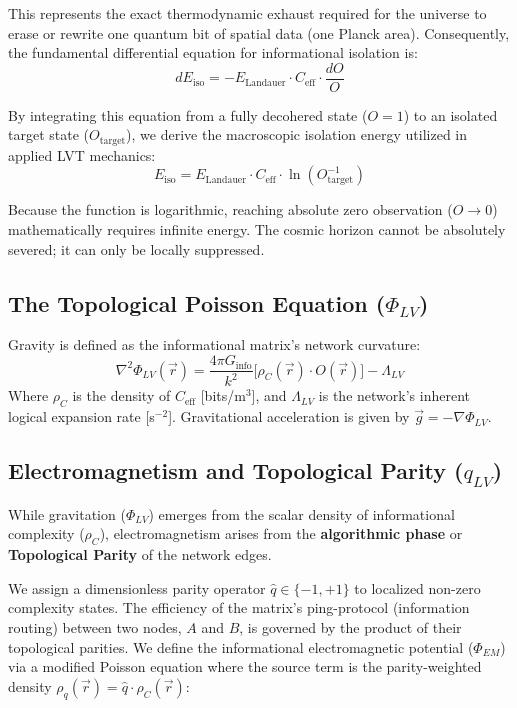 \documentclass[12pt,a4paper]{article}
\begin{document}
This represents the exact thermodynamic exhaust required for the universe to erase or rewrite one quantum bit of spatial data (one Planck area). Consequently, the fundamental differential equation for informational isolation is:
\begin{equation}
dE_{\mathrm{iso}} = -E_{\mathrm{Landauer}} \cdot C_{\mathrm{eff}} \cdot \frac{dO}{O}
\end{equation}

By integrating this equation from a fully decohered state ($O = 1$) to an isolated target state ($O_{\mathrm{target}}$), we derive the macroscopic isolation energy utilized in applied LVT mechanics:
\begin{equation}
E_{\mathrm{iso}} = E_{\mathrm{Landauer}} \cdot C_{\mathrm{eff}} \cdot \ln(O_{\mathrm{target}}^{-1})
\end{equation}

Because the function is logarithmic, reaching absolute zero observation ($O \to 0$) mathematically requires infinite energy. The cosmic horizon cannot be absolutely severed; it can only be locally suppressed.



\subsection{The Topological Poisson Equation ($\Phi_{LV}$)}
Gravity is defined as the informational matrix's network curvature:
\begin{equation}\label{eq:Phi_LV}
\nabla^2 \Phi_{LV}(\vec{r}) = \frac{4\pi G_{\mathrm{info}}}{k^2} \big[ \rho_{C}(\vec{r}) \cdot O(\vec{r}) \big] - \Lambda_{LV}
\end{equation}
Where $\rho_{C}$ is the density of $C_{\mathrm{eff}}$ [bits/m$^3$], and $\Lambda_{LV}$ is the network's inherent logical expansion rate [s$^{-2}$]. Gravitational acceleration is given by $\vec{g} = -\nabla \Phi_{LV}$.

\subsection{Electromagnetism and Topological Parity ($q_{LV}$)}
While gravitation ($\Phi_{LV}$) emerges from the scalar density of informational complexity ($\rho_C$), electromagnetism arises from the \textbf{algorithmic phase} or \textbf{Topological Parity} of the network edges. 

We assign a dimensionless parity operator $\hat{q} \in \{-1, +1\}$ to localized non-zero complexity states. The efficiency of the matrix's ping-protocol (information routing) between two nodes, $A$ and $B$, is governed by the product of their topological parities. We define the informational electromagnetic potential ($\Phi_{EM}$) via a modified Poisson equation where the source term is the parity-weighted density $\rho_q(\vec{r}) = \hat{q} \cdot \rho_C(\vec{r})$:
\end{document}
